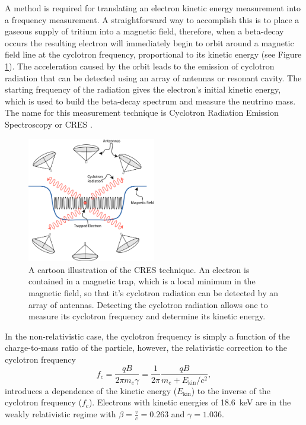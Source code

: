 A method is required for translating an electron kinetic energy measurement into a frequency measurement. A straightforward way to accomplish this is to place a gaseous supply of tritium into a magnetic field, therefore, when a beta-decay occurs the resulting electron will immediately begin to orbit around a magnetic field line at the cyclotron frequency, proportional to its kinetic energy (see Figure \ref{fig:chap3-cres-cartoon}). The acceleration caused by the orbit leads to the emission of cyclotron radiation that can be detected using an array of antennas or resonant cavity. The starting frequency of the radiation gives the electron's initial kinetic energy, which is used to build the beta-decay spectrum and measure the neutrino mass. The name for this measurement technique is Cyclotron Radiation Emission Spectroscopy or CRES \cite{p8originalcres}.

\begin{figure}[htbp]
    \centering
    \includegraphics[width=0.5\textwidth]{figs/Chapter-3/230303_cres_cartoon.png}
    \caption{A cartoon illustration of the CRES technique. An electron is contained in a magnetic trap, which is a local minimum in the magnetic field, so that it's cyclotron radiation can be detected by an array of antennas. Detecting the cyclotron radiation allows one to measure its cyclotron frequency and determine its kinetic energy.}
    \label{fig:chap3-cres-cartoon}
\end{figure}

In the non-relativistic case, the cyclotron frequency is simply a function of the charge-to-mass ratio of the particle, however, the relativistic correction to the cyclotron frequency
\begin{equation}
    f_c = \frac{qB}{2\pi m_e\gamma}=\frac{1}{2\pi}\frac{qB}{m_e+E_\mathrm{kin}/c^2},
    \label{eq:chap3-cyclotron-freq}
\end{equation} 
introduces a dependence of the kinetic energy ($E_\mathrm{kin}$) to the inverse of the cyclotron frequency ($f_c$). Electrons with kinetic energies of 18.6~keV are in the weakly relativistic regime with $\beta=\frac{v}{c}=0.263$ and $\gamma=1.036$.

